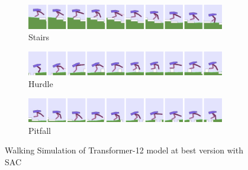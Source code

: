 \begin{figure}[!ht]
	\centering
	\begin{subfigure}{.95\textwidth}
		\centering
		\includegraphics[width=0.95\textwidth]{figures/bipedal/anim/trsf-12-stairs.png}
		\caption{Stairs}
		\label{fig:anim_trsf_stairs}
	\end{subfigure}
	\begin{subfigure}{.95\textwidth}
		\centering
		\includegraphics[width=0.95\textwidth]{figures/bipedal/anim/trsf-12-hurdle.png}
		\caption{Hurdle}
		\label{fig:anim_trsf_hurdle}
	\end{subfigure}
	\begin{subfigure}{.95\textwidth}
		\centering
		\includegraphics[width=0.95\textwidth]{figures/bipedal/anim/trsf-12-pitfall.png}
		\caption{Pitfall}
		\label{fig:anim_trsf_pitfall}
	\end{subfigure}
	\caption{Walking Simulation of Transformer-12 model at best version with SAC}
	\label{fig:trsf_simulation}
\end{figure}
